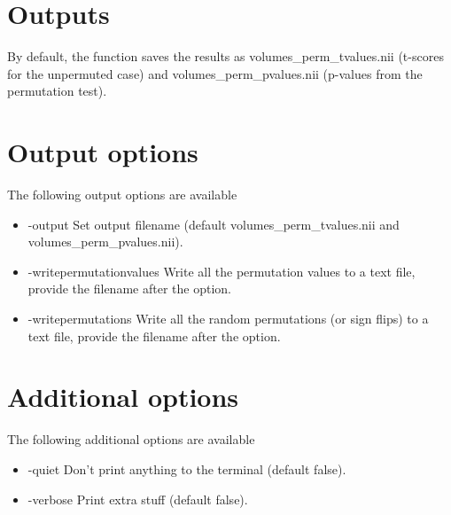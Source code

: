 \section{Outputs}

By default, the function saves the results as volumes\_perm\_tvalues.nii (t-scores for the unpermuted case) and volumes\_perm\_pvalues.nii (p-values from the permutation test).

\section{Output options}

The following output options are available

\begin{itemize}

\item -output 
\newline \newline Set output filename (default volumes\_perm\_tvalues.nii and volumes\_perm\_pvalues.nii).

\item -writepermutationvalues    
\newline \newline Write all the permutation values to a text file, \newline provide the filename after the option.

\item -writepermutations         
\newline \newline Write all the random permutations (or sign flips) to a text file, \newline provide the filename after the option.

\end{itemize}

\newpage

\section{Additional options}

The following additional options are available

\begin{itemize}

\item -quiet 
\newline \newline Don't print anything to the terminal (default false). 

\item -verbose
\newline \newline Print extra stuff (default false). 

\end{itemize}


